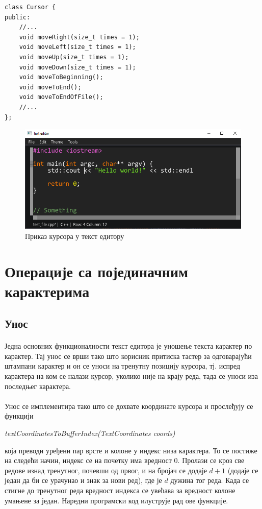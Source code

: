 \documentclass[12pt,oneside]{memoir}
\begin{document}
\begin{verbatim}
class Cursor {
public:
	//...
	void moveRight(size_t times = 1);
	void moveLeft(size_t times = 1);
	void moveUp(size_t times = 1);
	void moveDown(size_t times = 1);
	void moveToBeginning();
	void moveToEnd();
	void moveToEndOfFile();
	//...
};
\end{verbatim}

\begin{figure}[!ht]
	\centering
	\includegraphics[width=1.0\textwidth]{images/cursor.png}
	\caption{Приказ курсора у текст едитору}
	\label{fig:cursor}
\end{figure}

\section{Операције са појединачним карактерима}

\subsection{Унос}
\paragraph{}
Једна основних функционалности текст едитора је уношење текста карактер
по карактер. Тај унос се врши тако што корисник притиска тастер за одговарајући
штампани карактер и он се уноси на тренутну позицију курсора, тј. испред карактера на ком се налази курсор, уколико није на крају реда, тада се уноси иза последњег карактера. 

\paragraph{}
Унос се имплементира тако што се дохвате координате курсора и прослеђују се 
функцији
\begin{latinica}\textit{textCoordinatesToBufferIndex(TextCoordinates coords)}\end{latinica} 
која преводи уређени пар врсте и колоне у индекс низа карактера. То се постиже на
следећи начин, индекс се на почетку има вредност 0. Пролази се кроз све редове
изнад тренутног, почевши од првог, и на бројач се додаје \(d+1\) (додаје се један да би се урачунао и знак за нови ред), где је \(d\) дужина тог реда. 
Када се стигне до тренутног реда вредност индекса се увећава за вредност колоне умањене за
један. Наредни програмски код илуструје рад ове функције.
\end{document}
